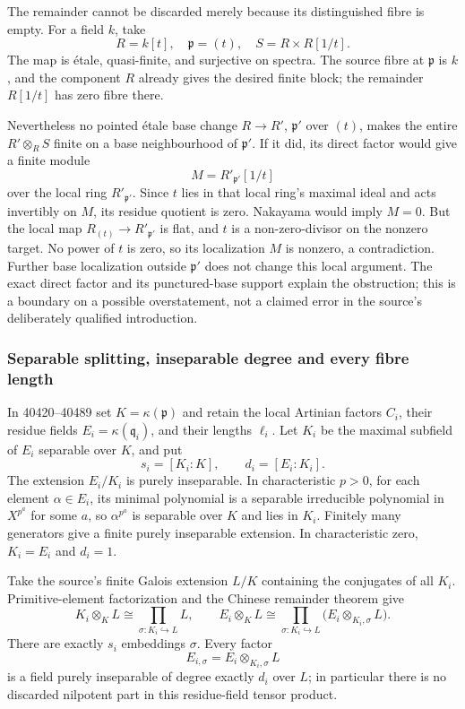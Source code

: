 The remainder cannot be discarded merely because its distinguished fibre is empty. For a field \(k\), take \[
R=k[t],\quad \mathfrak p=(t),\quad
S=R\times R[1/t].
\] The map is étale, quasi-finite, and surjective on spectra. The source fibre at \(\mathfrak p\) is \(k\), and the component \(R\) already gives the desired finite block; the remainder \(R[1/t]\) has zero fibre there.

Nevertheless no pointed étale base change \(R\to R'\), \(\mathfrak p'\) over \((t)\), makes the entire \(R'\otimes_R S\) finite on a base neighbourhood of \(\mathfrak p'\). If it did, its direct factor would give a finite module \[
M=R'_{\mathfrak p'}[1/t]
\] over the local ring \(R'_{\mathfrak p'}\). Since \(t\) lies in that local ring's maximal ideal and acts invertibly on \(M\), its residue quotient is zero. Nakayama would imply \(M=0\). But the local map \(R_{(t)}\to R'_{\mathfrak p'}\) is flat, and \(t\) is a non-zero-divisor on the nonzero target. No power of \(t\) is zero, so its localization \(M\) is nonzero, a contradiction. Further base localization outside \(\mathfrak p'\) does not change this local argument. The exact direct factor and its punctured-base support explain the obstruction; this is a boundary on a possible overstatement, not a claimed error in the source's deliberately qualified introduction.

\subsubsection{Separable splitting, inseparable degree and every fibre length}\label{algebra-proof-053-separable-splitting-inseparable-degree-and-every-fibre-length}

In 40420--40489 set \(K=\kappa(\mathfrak p)\) and retain the local Artinian factors \(C_i\), their residue fields \(E_i=\kappa(\mathfrak q_i)\), and their lengths \(\ell_i\). Let \(K_i\) be the maximal subfield of \(E_i\) separable over \(K\), and put \[
s_i=[K_i:K],\qquad d_i=[E_i:K_i].
\] The extension \(E_i/K_i\) is purely inseparable. In characteristic \(p>0\), for each element \(\alpha\in E_i\), its minimal polynomial is a separable irreducible polynomial in \(X^{p^a}\) for some \(a\), so \(\alpha^{p^a}\) is separable over \(K\) and lies in \(K_i\). Finitely many generators give a finite purely inseparable extension. In characteristic zero, \(K_i=E_i\) and \(d_i=1\).

Take the source's finite Galois extension \(L/K\) containing the conjugates of all \(K_i\). Primitive-element factorization and the Chinese remainder theorem give \[
K_i\otimes_K L\cong
\prod_{\sigma:K_i\hookrightarrow L}L,\qquad
E_i\otimes_K L\cong
\prod_{\sigma:K_i\hookrightarrow L}
\bigl(E_i\otimes_{K_i,\sigma}L\bigr).
\] There are exactly \(s_i\) embeddings \(\sigma\). Every factor \[
E_{i,\sigma}=E_i\otimes_{K_i,\sigma}L
\] is a field purely inseparable of degree exactly \(d_i\) over \(L\); in particular there is no discarded nilpotent part in this residue-field tensor product.

